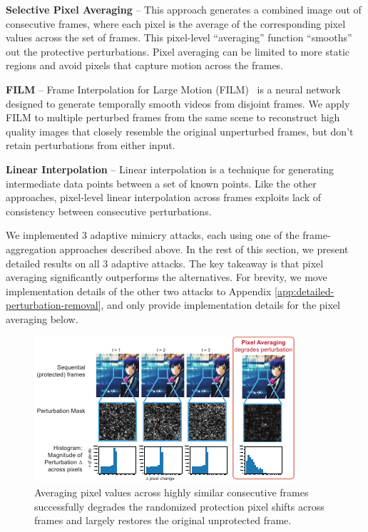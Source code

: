 \begin{packed_itemize}
\item \textbf{Selective Pixel Averaging} -- This approach generates a
  combined image out of consecutive frames, where each pixel is the average
  of the corresponding pixel values across the set of frames. This
  pixel-level ``averaging'' function ``smooths'' out the protective
  perturbations. Pixel averaging can be limited to more static regions and
  avoid pixels that capture motion across the frames. 
\item \textbf{FILM} -- Frame Interpolation for Large Motion
  (FILM)~\cite{reda2022film} is a neural network designed to generate
  temporally smooth videos from disjoint frames. We apply FILM to multiple
  perturbed frames from the same scene to reconstruct high quality images
  that closely resemble the original unperturbed frames, but don't retain
  perturbations from either input.
\item \textbf{Linear Interpolation} -- Linear interpolation is
  a technique for generating intermediate data points between a set of known
  points. Like the other approaches, pixel-level linear interpolation 
  across frames exploits lack of consistency between consecutive
  perturbations.
\end{packed_itemize}

 We implemented 3 adaptive mimicry attacks, each
using one of the frame-aggregation approaches described above. In the rest of
this section, we present detailed results on all 3 adaptive attacks. The key
takeaway is that pixel averaging significantly outperforms the
alternatives. For brevity, we move implementation details of the other two
attacks to Appendix \ref{app:detailed-perturbation-removal}, and only provide
implementation details for the pixel averaging below. 

\begin{figure}[t]
  \centering
  \includegraphics[width=1\columnwidth]{plots/pixel-averaging-scenario-04-eps-converted-to.pdf}
  \vspace{-0.2in}
  \caption{Averaging pixel values across highly similar consecutive frames
    successfully degrades the randomized protection pixel shifts across
    frames and largely restores the original unprotected frame. }
  \label{fig:pixel-averaging-attack}
\end{figure}

